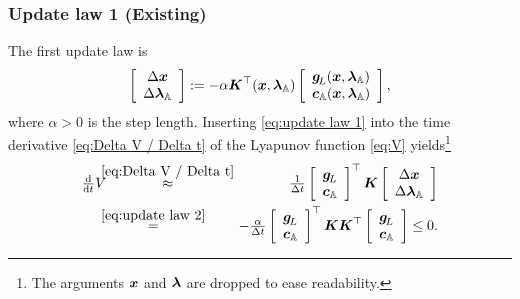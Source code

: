 \documentclass[journal]{IEEEtranTIE}
\newcommand{\CHHA}[1]{{\color{red} [CH: #1]}} %
\newcommand{\KYCH}[1]{{\color{blue} [KC: #1]}} %
\begin{document}

\subsubsection{Update law 1 (Existing)}
The first update law is 
%
\begin{equation}\label{eq:update law 1}
\left[ {\begin{array}{*{20}{c}}
{\Delta \mv{x}}\\
{\Delta \mv{\lambda}_{\mathbb{A}}}
\end{array}} \right] :=  - \alpha \mm{K}^\top(\mv{x},\mv{\lambda}_{\mathbb{A}})\left[ {\begin{array}{*{20}{c}}
{\mv{g}_{\!L}}(\mv{x},\mv{\lambda}_{\mathbb{A}})\\
{\mv{c}_{\mathbb{A}}}(\mv{x},\mv{\lambda}_{\mathbb{A}})
\end{array}} \right],
\end{equation}
where $\alpha >0$ is the step length. 
%
Inserting \eqref{eq:update law 1} into the time derivative \eqref{eq:Delta V / Delta t} of the Lyapunov function \eqref{eq:V} yields\footnote{The arguments $\boldsymbol{x}$ and $\boldsymbol{\lambda}$ are dropped to ease readability.}
\begin{eqnarray}
\ddtsmall V & \!\!\!\! \stackrel{\eqref{eq:Delta V / Delta t}}{\approx} \!\!\!\!  & \tfrac{1}{\Delta t}\left[ {\begin{array}{*{20}{c}}
{\mv{g}_{\!L}}\\
{\mv{c}_{\mathbb{A}}}
\end{array}} \right]^\top \mm{K} \left[ {\begin{array}{*{20}{c}}
{\Delta \mv{x}}\\
{\Delta \mv{\lambda}_{\mathbb{A}}}
\end{array}} \right] \notag \\
 & \!\!\!\! \stackrel{\eqref{eq:update law 2}}{=} \!\!\!\! & -\tfrac{\alpha}{\Delta t}\left[ {\begin{array}{*{20}{c}}
{\mv{g}_{\!L}}\\
{\mv{c}_{\mathbb{A}}}
\end{array}} \right]^\top \mm{K}\mm{K}^\top \left[ {\begin{array}{*{20}{c}}
{\mv{g}_{\!L}}\\
{\mv{c}_{\mathbb{A}}}
\end{array}} \right] \le 0.
\end{eqnarray}
\end{document}
